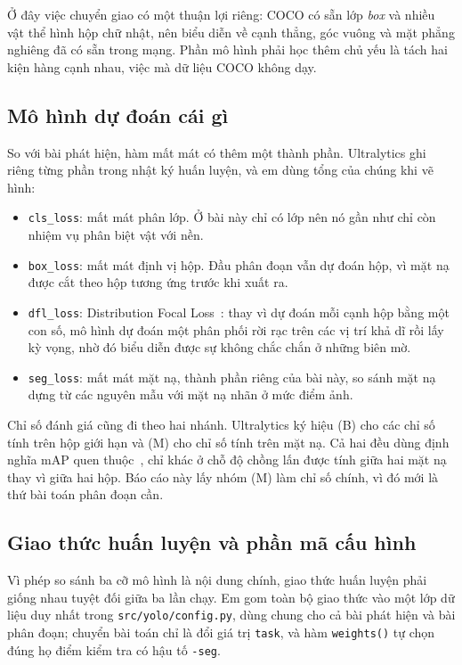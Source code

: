 \documentclass[11pt,a4paper]{article}
\begin{document}
Ở đây việc chuyển giao có một thuận lợi riêng: COCO có sẵn lớp \emph{box} và nhiều vật thể hình hộp
chữ nhật, nên biểu diễn về cạnh thẳng, góc vuông và mặt phẳng nghiêng đã có sẵn trong mạng. Phần
mô hình phải học thêm chủ yếu là tách hai kiện hàng cạnh nhau, việc mà dữ liệu COCO không dạy.

\subsection{Mô hình dự đoán cái gì}

So với bài phát hiện, hàm mất mát có thêm một thành phần. Ultralytics ghi riêng từng phần trong
nhật ký huấn luyện, và em dùng tổng của chúng khi vẽ hình:

\begin{itemize}
  \item \texttt{cls\_loss}: mất mát phân lớp. Ở bài này chỉ có \nclasses{} lớp nên nó gần như
        chỉ còn nhiệm vụ phân biệt vật với nền.
  \item \texttt{box\_loss}: mất mát định vị hộp. Đầu phân đoạn vẫn dự đoán hộp, vì mặt nạ được
        cắt theo hộp tương ứng trước khi xuất ra.
  \item \texttt{dfl\_loss}: Distribution Focal Loss~\cite{li2020}: thay vì dự đoán mỗi cạnh hộp
        bằng một con số, mô hình dự đoán một phân phối rời rạc trên các vị trí khả dĩ rồi lấy kỳ
        vọng, nhờ đó biểu diễn được sự không chắc chắn ở những biên mờ.
  \item \texttt{seg\_loss}: mất mát mặt nạ, thành phần riêng của bài này, so sánh mặt nạ dựng từ
        các nguyên mẫu với mặt nạ nhãn ở mức điểm ảnh.
\end{itemize}

Chỉ số đánh giá cũng đi theo hai nhánh. Ultralytics ký hiệu (B) cho các chỉ số tính trên hộp giới
hạn và (M) cho chỉ số tính trên mặt nạ. Cả hai đều dùng định nghĩa mAP quen thuộc~\cite{everingham2010},
chỉ khác ở chỗ độ chồng lấn được tính giữa hai mặt nạ thay vì giữa hai hộp. Báo cáo này lấy nhóm
(M) làm chỉ số chính, vì đó mới là thứ bài toán phân đoạn cần.

\subsection{Giao thức huấn luyện và phần mã cấu hình}

Vì phép so sánh ba cỡ mô hình là nội dung chính, giao thức huấn luyện phải giống nhau tuyệt đối
giữa ba lần chạy. Em gom toàn bộ giao thức vào một lớp dữ liệu duy nhất trong
\texttt{src/yolo/config.py}, dùng chung cho cả bài phát hiện và bài phân đoạn; chuyển bài toán chỉ
là đổi giá trị \texttt{task}, và hàm \texttt{weights()} tự chọn đúng họ điểm kiểm tra có hậu tố
\texttt{-seg}.
\end{document}
